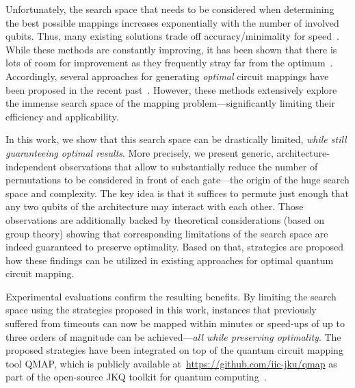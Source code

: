 \documentclass[10pt,conference]{IEEEtran}
\begin{document}
Unfortunately, the search space that needs to be considered when determining the best possible mappings increases exponentially with the number of involved qubits.
Thus, many existing solutions trade off accuracy/minimality for speed~\mbox{\cite{zulehnerEfficientMethodologyMapping2019, smithQuantumComputationalCompiler2019, liTacklingQubitMapping2019, matsuoReducingOverheadMapping2019, muraliNoiseadaptiveCompilerMappings2019,amyStaqFullstackQuantum2019,sivarajahKetRetargetableCompiler2020, zulehnerCompilingSUQuantum2019, hirataEfficientConversionQuantum2011}}.
While these methods are constantly improving, it has been shown that there is lots of room for improvement as they frequently stray far from the optimum~\cite{willeMappingQuantumCircuits2019}.
Accordingly, several approaches for generating \emph{optimal} circuit mappings have been proposed 
in the recent past~\cite{siraichiQubitAllocation2018,zhangTimeoptimalQubitMapping2021, tanOptimalLayoutSynthesis2020,dealmeidaFindingOptimalQubit2019,zhuExactQubitAllocation2020, willeMappingQuantumCircuits2019}. 
However, these methods extensively explore the immense search space of the mapping problem---significantly limiting their efficiency and applicability.

In this work, we show that this search space can be drastically limited, \emph{while still guaranteeing optimal results}. 
More precisely,
we present generic, architecture-independent observations that allow to substantially reduce the number of permutations to be considered in front of each gate---the origin of the huge search space and complexity.
The key idea is that it suffices to permute just enough that any two qubits of the architecture may interact with each other.
Those observations are additionally backed by theoretical considerations (based on group theory) showing that corresponding limitations of the search space  are indeed guaranteed to preserve optimality. Based on that, strategies are proposed how these findings can be utilized in existing approaches for optimal quantum circuit mapping. 

Experimental evaluations 
confirm the resulting benefits. 
By limiting the search space using the strategies  
proposed in this work, instances that previously suffered from timeouts  
can now be mapped within minutes or speed-ups of up to three orders of magnitude can be achieved---\emph{all while preserving optimality}.
The proposed strategies have been integrated on top of the quantum circuit mapping tool QMAP, which is publicly available at~\url{https://github.com/iic-jku/qmap} as part of the open-source JKQ toolkit for quantum computing~\cite{willeJKQJKUTools2020}.
\end{document}
